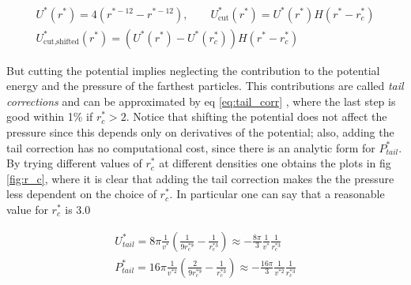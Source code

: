 \documentclass[a4paper, 11pt]{article}
\begin{document}
    \begin{gather*} \label{eq:cut}
      U^*(r^*) = 4 \left(r^{*-12} - r^{*-12} \right), \qquad
      U_{\text{cut}}^*(r^*) = U^*(r^*)H(r^* - r_c^*) \\
      U_{\text{cut,shifted}}^*(r^*) = (U^*(r^*) - U^*(r_c^*))H(r^* - r_c^*)
    \end{gather*}

    But cutting the potential implies neglecting the contribution to the potential energy and the pressure of the farthest particles. This contributions are called \emph{tail corrections} and can be approximated by eq \ref{eq:tail_corr} \cite{rif:tail}, where the last step is good within 1\% if $r_c^* > 2$. Notice that shifting the potential does not affect the pressure since this depends only on derivatives of the potential; also, adding the tail correction has no computational cost, since there is an analytic form for $P_{tail}^*$. \\
    By trying different values of $r_c^*$ at different densities one obtains the plots in fig \ref{fig:r_c}, where it is clear that adding the tail correction makes the the pressure less dependent on the choice of $r_c^*$. In particular one can say that a reasonable value for $r_c^*$ is 3.0


    \begin{gather} \label{eq:tail_corr}
      U_{tail}^* = 8\pi \frac{1}{v^*} \left(\frac{1}{9r_c^{*9}} - \frac{1}{r_c^{*3}} \right)
      \approx  - \frac{8\pi}{3} \frac{1}{v^*} \frac{1}{r_c^{*3}}
      \\
      P_{tail}^* = 16\pi \frac{1}{v^{*2}} \left(\frac{2}{9r_c^{*9}} - \frac{1}{r_c^{*3}} \right)
      \approx - \frac{16\pi}{3} \frac{1}{v^{*2}} \frac{1}{r_c^{*3}}
    \end{gather}
\end{document}
